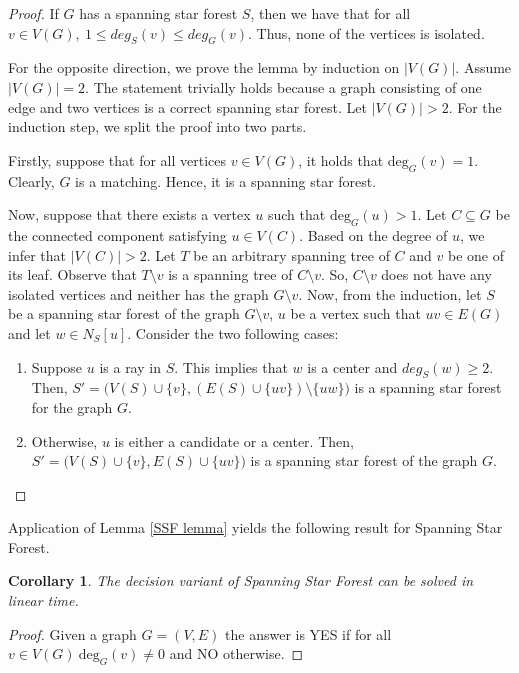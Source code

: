 \documentclass[en]{pracamgr}
\newtheorem{corollary}{Corollary}
\theoremstyle{definition}
\newcommand{\ssf}{spanning star forest}
\newcommand{\ssfp}{{\sc Spanning Star Forest}}
\newcommand{\degree}[2]{\textrm{deg}_{#1}(#2)}
\begin{document}
\begin{proof}
	If $G$ has a \ssf{} $S$, then we have that for all $v \in V(G),\ 1 \leq deg_S(v) \leq deg_G(v)$. Thus, none of the vertices is isolated.
	
	For the opposite direction, we prove the lemma by induction on $|V(G)|$. Assume $|V(G)|=2$. The statement trivially holds because a graph consisting of one edge and two vertices is a correct \ssf{}. Let $|V(G)| >2$. For the induction step, we split the proof into two parts. 
	
	Firstly, suppose that for all vertices $v \in V(G)$, it holds that $\degree{G}{v}=1$.  Clearly, $G$ is a matching. Hence, it is a \ssf{}. 
	
	Now, suppose that there exists a vertex $u$ such that $\degree{G}{u}>1$. Let $C \subseteq G$ be the connected component satisfying $u \in V(C)$. Based on the degree of $u$, we infer that $|V(C)|>2$. Let $T$ be an arbitrary spanning tree of $C$ and $v$ be one of its leaf. Observe that $T \setminus v$ is a spanning tree of $C \setminus v$. So, $C \setminus v$ does not have any isolated vertices and neither has the graph $G \setminus v$. Now, from the induction, let $S$ be a \ssf{} of the graph $G \setminus v$, $u$ be a vertex such that $uv \in E(G)$ and let $w \in N_S[u]$. Consider the two following cases:
	\begin{enumerate}
		\item Suppose $u$ is a ray in $S$. This implies that $w$ is a center and $deg_S(w) \geq 2$. Then, $S'=\big(V(S) \cup \{v\},(E(S) \cup \{uv\}) \setminus \{uw\}\big)$ is a spanning star forest for the graph $G$.
		\item Otherwise, $u$ is either a candidate or a center. Then, $S'=\big(V(S) \cup \{v\}, E(S) \cup \{uv\}\big)$ is a spanning star forest of the graph $G$. \qedhere
	\end{enumerate}
	
\end{proof}

Application of Lemma \ref{SSF lemma} yields the following result for \ssfp{}.

\begin{corollary}
	The decision variant of \ssfp{} can be solved in linear time.
\end{corollary}

\begin{proof}
	Given a graph $G = (V,E)$ the answer is YES if for all $v \in V(G)\ \degree{G}{v} \neq 0$ and NO otherwise.
\end{proof}
\end{document}
